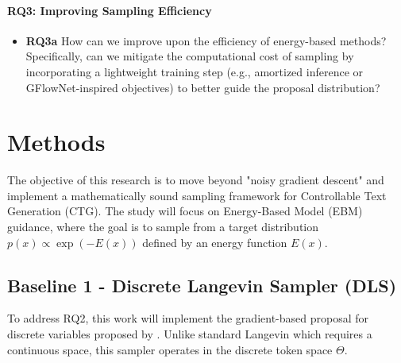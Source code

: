 \documentclass[11pt]{article}
\begin{document}
\paragraph{RQ3: Improving Sampling Efficiency}
\begin{itemize}
    \item \textbf{RQ3a}
    How can we improve upon the efficiency of energy-based methods? Specifically, can we mitigate the computational cost of sampling by incorporating a lightweight training step (e.g., amortized inference or GFlowNet-inspired objectives) to better guide the proposal distribution?
\end{itemize}





\section{Methods}
The objective of this research is to move beyond "noisy gradient descent" and implement a mathematically sound sampling framework for Controllable Text Generation (CTG). The study will focus on Energy-Based Model (EBM) guidance, where the goal is to sample from a target distribution $p(x) \propto \exp(-E(x))$ defined by an energy function $E(x)$.
\subsection{Baseline 1  - Discrete Langevin Sampler (DLS)}



To address RQ2, this work will implement the gradient-based proposal for discrete variables proposed by \cite{zhang2022langevinlikesamplerdiscretedistributions}. Unlike standard Langevin which requires a continuous space, this sampler operates in the discrete token space $\Theta$.
\end{document}
